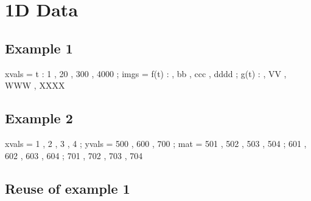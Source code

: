 \documentclass[12pt]{article}
\begin{document}


\section{1D Data}

\subsection{Example 1}

\begin{functable}
    xvals =    t : 1 , 20 , 300 , 4000 ;
    imgs  = f(t) :  , bb , ccc , dddd ;
            g(t) :  , VV , WWW , XXXX
\end{functable}


\subsection{Example 2}

\begin{functable}
    xvals = 1  , 2  , 3  , 4 ;
    yvals = 500 , 600 , 700 ;
    mat   = 501 , 502 , 503 , 504 ;
            601 , 602 , 603 , 604 ;
            701 , 702 , 703 , 704 
\end{functable}


\subsection{Reuse of example 1}

\begin{functable}[1]
\end{functable}


%
%
%
%
%
%
\end{document}
